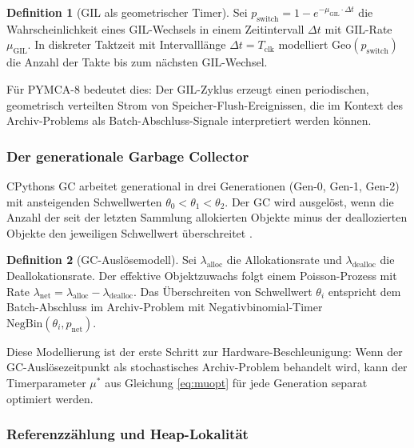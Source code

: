 ﻿\documentclass[a4paper,12pt]{scrreprt}
\theoremstyle{definition}
\newtheorem{definition}{Definition}[section]
\newcommand{\Geo}{\mathrm{Geo}}
\newcommand{\NBin}{\mathrm{NegBin}}
\begin{document}
	\begin{definition}[GIL als geometrischer Timer]
		\label{def:gil_geo}
		Sei $p_{\mathrm{switch}} = 1 - e^{-\mu_{\mathrm{GIL}} \cdot \Delta t}$ die
		Wahrscheinlichkeit eines GIL-Wechsels in einem Zeitintervall $\Delta t$
		mit GIL-Rate $\mu_{\mathrm{GIL}}$. In diskreter Taktzeit mit Intervalllänge
		$\Delta t = T_{\mathrm{clk}}$ modelliert $\Geo(p_{\mathrm{switch}})$
		die Anzahl der Takte bis zum nächsten GIL-Wechsel.
	\end{definition}
	
	Für PYMCA-8 bedeutet dies: Der GIL-Zyklus erzeugt einen periodischen,
	geometrisch verteilten Strom von Speicher-Flush-Ereignissen, die im
	Kontext des Archiv-Problems als Batch-Abschluss-Signale interpretiert
	werden können.
	
	\subsubsection{Der generationale Garbage Collector}
	
	CPythons GC arbeitet generational in drei Generationen (Gen-0, Gen-1,
	Gen-2) mit ansteigenden Schwellwerten $\theta_0 < \theta_1 < \theta_2$.
	Der GC wird ausgelöst, wenn die Anzahl der seit der letzten Sammlung
	allokierten Objekte minus der deallozierten Objekte den jeweiligen
	Schwellwert überschreitet \cite{python_gc}.
	
	\begin{definition}[GC-Auslösemodell]
		\label{def:gc_model}
		Sei $\lambda_{\mathrm{alloc}}$ die Allokationsrate und
		$\lambda_{\mathrm{dealloc}}$ die Deallokationsrate. Der effektive
		Objektzuwachs folgt einem Poisson-Prozess mit Rate
		$\lambda_{\mathrm{net}} = \lambda_{\mathrm{alloc}} - \lambda_{\mathrm{dealloc}}$.
		Das Überschreiten von Schwellwert $\theta_i$ entspricht dem
		Batch-Abschluss im Archiv-Problem mit Negativbinomial-Timer
		$\NBin(\theta_i, p_{\mathrm{net}})$.
	\end{definition}
	
	Diese Modellierung ist der erste Schritt zur Hardware-Beschleunigung:
	Wenn der GC-Auslösezeitpunkt als stochastisches Archiv-Problem
	behandelt wird, kann der Timerparameter $\mu^*$ aus Gleichung
	\eqref{eq:muopt} für jede Generation separat optimiert werden.
	
	\subsubsection{Referenzzählung und Heap-Lokalität}
	
\end{document}
